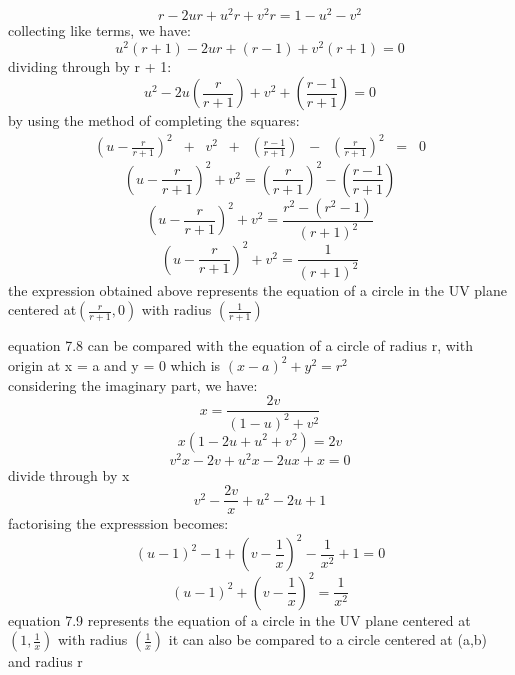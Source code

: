 \begin{equation*}
r - 2ur + u^2r + v^2r = 1 - u^2 - v^2
\end{equation*}
collecting like terms, we have:
\begin{equation*}
u^2(r + 1) -2ur + (r - 1) + v^2(r + 1) = 0
\end{equation*}
dividing through by r + 1:
\begin{equation}
u^2 - 2u(\frac{r}{r + 1}) + v^2 +(\frac{r - 1}{r + 1}) = 0
\end{equation}
by using the method of completing the squares:
\begin{align*}
(u - \frac{r}{r+1})^2\;\;+\;\;v^2\;\;+\;\;(\frac{r-1}{r+1})\;\; - \;\;(\frac{r}{r+1})^2\;\; = \;\;0
\end{align*}
\begin{equation*}
(u - \frac{r}{r + 1})^2 + v^2 =(\frac{r}{r + 1})^2 -(\frac{r - 1}{r + 1}) 
\end{equation*}
\begin{equation*}
(u - \frac{r}{r + 1})^2+ v^2 =\frac{r^2 -(r^2 -1)}{(r + 1)^2}
\end{equation*}
\begin{equation}
(u - \frac{r}{r + 1})^2+ v^2 = \frac{1}{(r + 1)^2}
\end{equation}
the expression obtained above represents the equation of a circle in the UV plane centered at$ (\frac{r}{r + 1}, 0) $ with radius $ (\frac{1}{r + 1}) $

equation 7.8 can be compared  with  the equation of a circle of radius r, with origin at x = a and y = 0 which is $ (x - a)^2 + y^2 = r^2 $\\ 
considering the imaginary part, we have:
\begin{equation*}
x =\frac{2v}{(1 - u)^2 + v^2}
\end{equation*}
\begin{equation*}
x(1 - 2u + u^2 + v^2) = 2v
\end{equation*}
\begin{equation*}
v^2x - 2v + u^2x - 2ux + x = 0
\end{equation*}
divide through by x
\begin{equation*}
v^2 - \frac{2v}{x} +u^2 - 2u + 1
\end{equation*}
factorising the expresssion becomes:
\begin{equation*}
(u - 1)^2 -1 + (v - \frac{1}{x})^2 -\frac{1}{x^2} + 1 = 0
\end{equation*}
\begin{equation}
(u - 1)^2 + (v - \frac{1}{x})^2 = \frac{1}{x^2}
\end{equation}
equation 7.9 represents the equation of a circle in the UV plane centered at$ (1,\frac{1}{x}) $ with radius $ (\frac{1}{x}) $
it can also be compared to a circle centered at (a,b) and radius r

